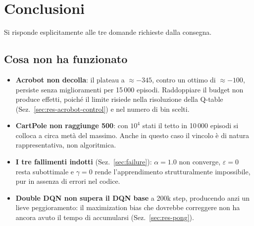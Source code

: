 \section{Conclusioni}
\label{sec:conclusions}

Si risponde esplicitamente alle tre domande richieste dalla consegna.

\subsection{Cosa non ha funzionato}
\begin{itemize}
  \item \textbf{Acrobot non decolla}: il plateau a $\approx -345$, contro un ottimo di
        $\approx -100$, persiste senza miglioramenti per 15\,000 episodi. Raddoppiare
        il budget non produce effetti, poich\'e il limite risiede nella risoluzione della
        Q-table (Sez.~\ref{sec:res-acrobot-control}) e nel numero di bin scelti.
  \item \textbf{CartPole non raggiunge 500}: con $10^4$ stati il tetto in 10\,000
        episodi si colloca a circa met\`a del massimo. Anche in questo caso il vincolo
        \`e di natura rappresentativa, non algoritmica.
  \item \textbf{I tre fallimenti indotti} (Sez.~\ref{sec:failure}): $\alpha=1.0$ non
        converge, $\varepsilon=0$ resta subottimale e $\gamma=0$ rende l'apprendimento
        strutturalmente impossibile, pur in assenza di errori nel codice.
  \item \textbf{Double DQN non supera il DQN base} a 200k step, producendo anzi un lieve
        peggioramento: il maximization bias che dovrebbe correggere non ha ancora avuto
        il tempo di accumularsi (Sez.~\ref{sec:res-pong}).
\end{itemize}

